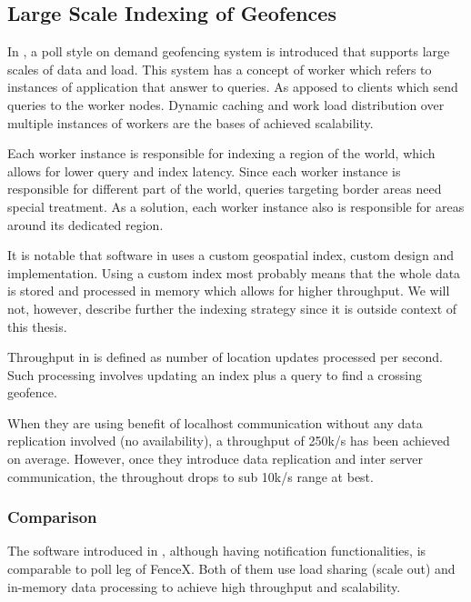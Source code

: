 \documentclass[a4]{report}
\begin{document}
    \subsection{Large Scale Indexing of Geofences}
    In \cite{Cirillo-Jacobs-Martin-Szczytowski-2014}, a poll style on demand geofencing system is introduced that supports large scales
    of data and load.
    This system has a concept of worker which refers to instances of application that answer to queries.
    As apposed to clients which send queries to the worker nodes.
    Dynamic caching and work load distribution over multiple instances of workers are the bases of achieved
    scalability.

    Each worker instance is responsible for indexing a region of the world, which allows for lower query and index latency.
    Since each worker instance is responsible for different part of the world, queries targeting border areas need
    special treatment.
    As a solution, each worker instance also is responsible for areas around its dedicated region.

    It is notable that software in \cite{Cirillo-Jacobs-Martin-Szczytowski-2014} uses a custom geospatial index,
    custom design and implementation.
    Using a custom index most probably means that the whole data is stored and processed in memory which allows for higher throughput.
    We will not, however, describe further the indexing strategy since it is outside context of this thesis.

    Throughput in \cite{Cirillo-Jacobs-Martin-Szczytowski-2014} is defined as number of location updates processed per second.
    Such processing involves updating an index plus a query to find a crossing geofence.

    When they are using benefit of localhost communication without any data replication involved (no availability), a
    throughput of 250k/s has been achieved on average.
    However, once they introduce data replication and inter server communication, the throughout drops to sub 10k/s
    range at best.

    \subsubsection{Comparison}
    The software introduced in \cite{Cirillo-Jacobs-Martin-Szczytowski-2014}, although having notification
    functionalities, is comparable to poll leg of FenceX.
    Both of them use load sharing (scale out) and in-memory data processing to achieve high throughput and
    scalability.
\end{document}
